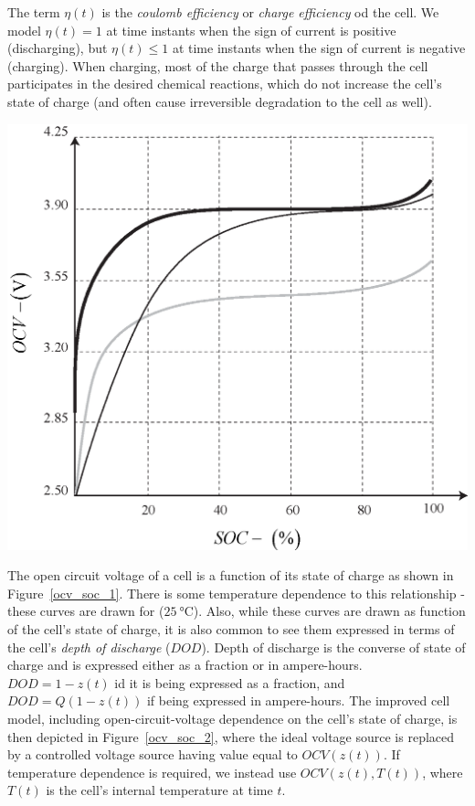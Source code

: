 \documentclass[11pt,a4paper]{article}
\numberwithin{equation}{section}
\theoremstyle{it}
\theoremstyle{definition}
\begin{document}
The term $\eta(t)$ is the \textit{coulomb efficiency} or \textit{charge efficiency} od the cell. We model $\eta(t) = 1$ at time instants when the sign of current is positive (discharging), but $\eta(t)\le 1$ at time instants when the sign of current is negative (charging). When charging, most of the charge that passes through the cell participates in the desired chemical reactions, which do not increase the cell's state of charge (and often cause irreversible degradation to the cell as well).
\vfill%
\noindent
\begin{minipage}{0.4\textwidth}%
	\includegraphics[width=\linewidth]{figures/lithium_ion_battery/ocv_soc_1.eps}
	\label{ocv_soc_1}
\end{minipage}%
\hfill%
\begin{minipage}{0.55\textwidth}
	The open circuit voltage of a cell is a function of its state of charge as shown in Figure~\ref{ocv_soc_1}. There is some temperature dependence to this relationship - these curves are drawn for  ($\SI{25}{\celsius}$). Also, while these curves are drawn as function of the cell's state of charge, it is also common to see them expressed in terms of the cell's \textit{depth of discharge} ($DOD$). Depth of discharge is the converse of state of charge and is expressed either as a fraction or in ampere-hours. $DOD=1-z(t)$ id it is being expressed as a fraction, and $DOD=Q(1-z(t))$ if being  expressed in ampere-hours. The improved cell model, including open-circuit-voltage dependence on the cell's state of charge, is then depicted in Figure~\ref{ocv_soc_2}, where the ideal voltage source is replaced by a controlled voltage source having value equal to $OCV(z(t))$. If temperature dependence is required, we instead use $OCV(z(t),T(t))$, where $T(t)$ is the cell's internal temperature at time $t$.
\end{minipage}
\end{document}

